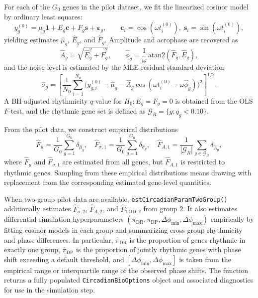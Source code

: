 \documentclass{article}
\begin{document}
For each of the $G_0$ genes in the pilot dataset, we fit the linearized cosinor
model by ordinary least squares:
\begin{equation}
y_g^{(0)}=\mu_g\mathbf{1}+E_g\mathbf{c}+F_g\mathbf{s}+\boldsymbol\varepsilon_g,
\qquad
\mathbf{c}_i=\cos(\omega t_i^{(0)}),\;\mathbf{s}_i=\sin(\omega t_i^{(0)}),
\label{eq:pilot_fit}
\end{equation}
yielding estimates $\hat{\mu}_g$, $\hat{E}_g$, and $\hat{F}_g$.
Amplitude and acrophase are recovered as
\[
\hat{A}_g=\sqrt{\hat{E}_g^2+\hat{F}_g^2},
\qquad
\hat{\phi}_g=\frac{1}{\omega}\,\mathrm{atan2}\!\left(\hat{F}_g,\hat{E}_g\right),
\]
and the noise level is estimated by the MLE residual standard deviation
\begin{equation}
\hat{\sigma}_g
=
\left[
\frac{1}{N_0}\sum_{i=1}^{N_0}
\bigl(
y_{g,i}^{(0)}-\hat{\mu}_g-\hat{A}_g\cos(\omega t_i^{(0)}-\omega\hat{\phi}_g)
\bigr)^2
\right]^{1/2}.
\label{eq:pilot_sigma}
\end{equation}
A BH-adjusted rhythmicity $q$-value for $H_0:E_g=F_g=0$ is obtained from the
OLS $F$-test, and the rhythmic gene set is defined as
$\mathcal{G}_R=\{g:q_g<0.10\}$.

From the pilot data, we construct empirical distributions
\begin{equation}
\hat{F}_\mu=\frac{1}{G_0}\sum_{g=1}^{G_0}\delta_{\hat{\mu}_g},
\quad
\hat{F}_{\sigma,1}=\frac{1}{G_0}\sum_{g=1}^{G_0}\delta_{\hat{\sigma}_g},
\quad
\hat{F}_{A,1}=\frac{1}{|\mathcal{G}_R|}\sum_{g\in\mathcal{G}_R}\delta_{\hat{A}_g},
\label{eq:empirical_dists}
\end{equation}
where $\hat{F}_\mu$ and $\hat{F}_{\sigma,1}$ are estimated from all genes, but
$\hat{F}_{A,1}$ is restricted to rhythmic genes. Sampling from these empirical
distributions means drawing with replacement from the corresponding estimated
gene-level quantities.

When two-group pilot data are available,
\texttt{estCircadianParamTwoGroup()} additionally estimates
$\hat{F}_{\sigma,2}$, $\hat{F}_{A,2}$, and $\hat{F}_{\mathrm{TOD},2}$ from
group 2. It also estimates differential simulation hyperparameters
$(\pi_{\mathrm{DR}},\pi_{\mathrm{DP}},\Delta\phi_{\min},\Delta\phi_{\max})$
empirically by fitting cosinor models in each group and summarizing
cross-group rhythmicity and phase differences. In particular,
$\hat{\pi}_{\mathrm{DR}}$ is the proportion of genes rhythmic in exactly one
group, $\hat{\pi}_{\mathrm{DP}}$ is the proportion of jointly rhythmic genes
with phase shift exceeding a default threshold, and
$[\Delta\phi_{\min},\Delta\phi_{\max}]$ is taken from the empirical range or
interquartile range of the observed phase shifts. The function returns a fully
populated \texttt{CircadianBioOptions} object and associated diagnostics for use
in the simulation step.
\end{document}
